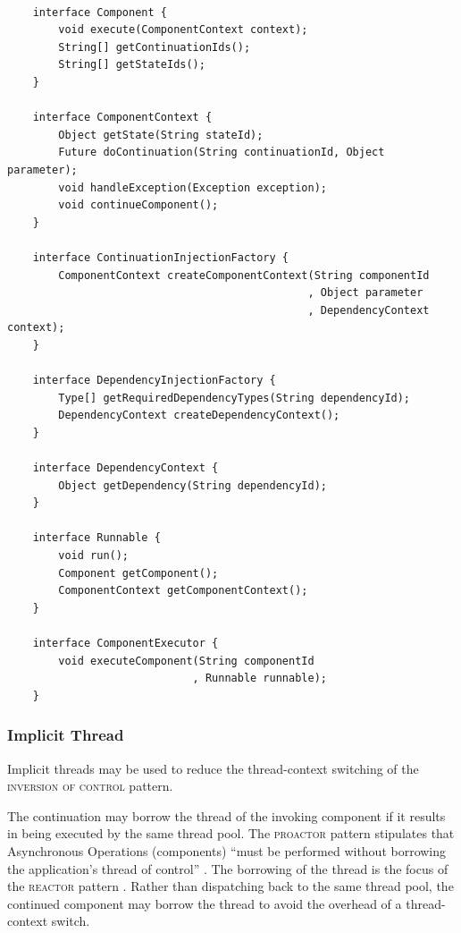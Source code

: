 \documentclass[prodmode]{style/acmlarge}
\begin{document}
\begin{lstlisting}[float,label=lst:IocInjectionInterfaces]

    interface Component {
        void execute(ComponentContext context);
        String[] getContinuationIds();
        String[] getStateIds();
    }

    interface ComponentContext {
        Object getState(String stateId);
        Future doContinuation(String continuationId, Object parameter);
        void handleException(Exception exception);
        void continueComponent();
    }
    
    interface ContinuationInjectionFactory {
        ComponentContext createComponentContext(String componentId
                                               , Object parameter
                                               , DependencyContext context);
    }
    
    interface DependencyInjectionFactory {
        Type[] getRequiredDependencyTypes(String dependencyId);
        DependencyContext createDependencyContext();
    }
    
    interface DependencyContext {
        Object getDependency(String dependencyId);
    }
    
    interface Runnable {
        void run();
        Component getComponent();
        ComponentContext getComponentContext();
    }

    interface ComponentExecutor {
        void executeComponent(String componentId 
                             , Runnable runnable);
    }
\end{lstlisting}


\subsubsection*{Implicit Thread}

Implicit threads may be used to reduce the thread-context switching of the
\textsc{inversion of control} pattern.

The continuation may borrow the thread of the invoking component if it results
in being executed by the same thread pool.  The \textsc{proactor} pattern
stipulates that Asynchronous Operations (components) ``must be performed without
borrowing the application's thread of control'' \cite[p. 8]{proactor}.  The
borrowing of the thread is the focus of the \textsc{reactor} pattern
\cite{reactor}.  Rather than dispatching back to the same thread pool, the
continued component may borrow the thread to avoid the overhead of a
thread-context switch.
\end{document}
